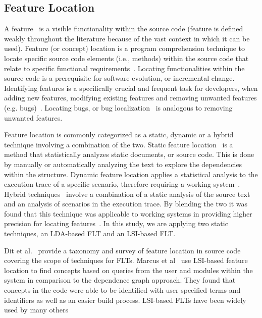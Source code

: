 \subsection{Feature Location}

A feature~\cite{Biggerstaff-etal:1993} is a visible functionality within the source code
(feature is defined weakly throughout the literature because of the vast
context in which it can be used). Feature (or concept) location is a program
comprehension technique to locate specific source code elements (i.e., methods)
within the source code that relate to specific functional
requirements~\cite{Eisenbarth-etal:2001, Biggers-etal:2014}. Locating functionalities
within the source code is a prerequisite for software evolution, or incremental
change.  Identifying features is a specifically crucial and frequent task for
developers, when adding new features, modifying existing features and removing
unwanted features (e.g.  bugs)~\cite{Rajlich-Gosavi:2004, Dit-etal:2013b}. Locating bugs,
or bug localization~\cite{Lukins-etal:2008, Bassett-Kraft:2013} is analogous to removing unwanted features.

Feature location is commonly categorized as a static, dynamic or a hybrid
technique involving a combination of the two. Static feature
location~\cite{Zhao-etal:2006} is a method that statistically analyzes
static documents, or source code. This is done by manually or automatically
analyzing the text to explore the dependencies within the structure. Dynamic
feature location applies a statistical analysis to the execution trace of a
specific scenario, therefore requiring a working system~\cite{Eisenbarth-etal:2001,Poshyvanyk-etal:2007}.
Hybrid techniques~\cite{Eisenbarth-etal:2003, Eaddy-etal:2008, Revelle-etal:2010} involve a combination of a static analysis of
the source text and an analysis of scenarios in the execution trace. By
blending the two it was found that this technique was applicable to working
systems in providing higher precision for locating features~\cite{Poshyvanyk-etal:2007,
Ernst:2004, Revelle-Coppitt:UNK}. In this study, we are applying two static
techniques, an LDA-based FLT and an LSI-based FLT.

Dit et al.~\cite{Dit-etal:2013b} provide a taxonomy and survey of feature
location in source code covering the scope of techniques for FLTs.  Marcus et
al~\cite{Marcus-etal:2004} use LSI-based feature location to find concepts based on
queries from the user and modules within the system in comparison to the
dependence graph approach. They found that concepts in the code were able to be
identified with user specified terms and identifiers as well as an easier build
process. LSI-based FLTs have been widely used by many others~\cite{
Poshyvanyk-etal:2006, Poshyvanyk-Marcus:2007, Liu-etal:2007, Scanniello-Marcus:2011,
Eaddy-etal:2008, Cubranic-etal:2005}

